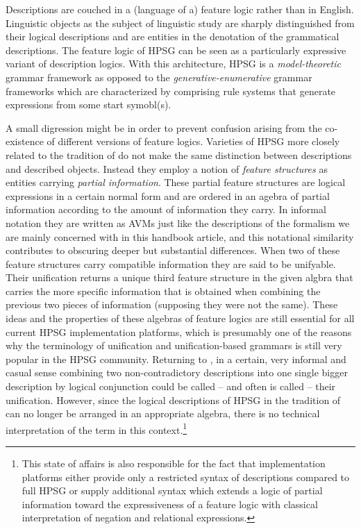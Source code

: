 \documentclass[output=paper
                ,modfonts
                ,nonflat
	        ,collection
	        ,collectionchapter
	        ,collectiontoclongg
 	        ,biblatex
                ,babelshorthands
                ,newtxmath
                ,draftmode
                ,colorlinks, citecolor=brown
]{./langsci/langscibook}
\begin{document}
{Descriptions are couched in a (language of a) feature logic rather
than in English. Linguistic objects as the subject of linguistic study
are sharply distinguished from their logical descriptions and are
entities in the denotation of the grammatical descriptions.  The
feature logic of HPSG can be seen as a particularly expressive variant
of description logics. With this architecture, HPSG is a
\emph{model-theoretic} grammar framework as opposed to the
\emph{generative-enumerative} grammar frameworks which are
characterized by comprising rule systems that generate expressions
from some start symobl(s).

A small digression might be in order to prevent confusion arising from the
co-existence of different versions of feature logics.  Varieties of
HPSG more closely related to the tradition of \cite{PollardSag1987} do
not make the same distinction between descriptions and described
objects. Instead they employ a notion of \emph{feature structures} as
entities carrying \emph{partial information}. These partial feature
structures are logical expressions in a certain normal form and are
ordered in an agebra of partial information according to the amount of
information they carry. In informal notation they are written as AVMs
just like the descriptions of the formalism we are mainly concerned
with in this handbook article, and this notational similarity
contributes to obscuring deeper but substantial differences.  When
two of these feature structures carry compatible information they are
said to be unifyable. Their unification returns a unique third feature
structure in the given algbra that carries the more specific
information that is obtained when combining the previous two pieces of
information (supposing they were not the same). These ideas and the
properties of these algebras of feature logics are still essential for
all current HPSG implementation platforms, which is presumably one of
the reasons why the terminology of unification and unification-based
grammars is still very popular in the HPSG community. Returning to
\cite{PollardSag1994}, in a certain, very informal and casual sense
combining two non-contradictory descriptions into one single bigger
description by logical conjunction could be called -- and often is
called -- their unification. However, since the logical descriptions of
HPSG in the tradition of \cite{PollardSag1994} can no longer be arranged
in an appropriate algebra, there is no technical interpretation of the
term in this context.\footnote{This state of affairs is also responsible for the fact that implementation platforms either provide only a restricted syntax of descriptions compared to full HPSG or supply additional syntax which extends a logic of partial information toward the expressiveness of a feature logic with classical interpretation of negation and relational expressions.}

}
\end{document}
